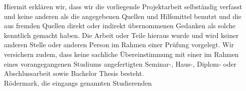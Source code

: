 Hiermit erklären wir, dass wir die vorliegende Projektarbeit selbständig verfasst und keine anderen als die angegebenen Quellen und Hilfsmittel benutzt und die aus fremden Quellen direkt oder indirekt übernommenen Gedanken als solche kenntlich gemacht haben. Die Arbeit oder Teile hieraus wurde und wird keiner anderen Stelle oder anderen Person im Rahmen einer Prüfung vorgelegt. Wir versichern zudem, dass keine sachliche Übereinstimmung mit einer im Rahmen eines vorangegangenen Studiums angefertigten Seminar-, Haus-, Diplom- oder Abschlussarbeit sowie Bachelor Thesis besteht.
\\ [1.2em]
Rödermark, die eingangs genannten Studierenden
\\ [1.2em]
